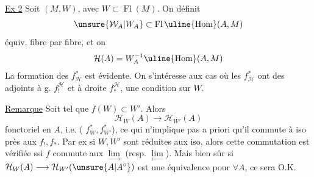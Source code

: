 \uline{Ex 2} Soit $(M,W)$, avec $W\subset\operatorname{Fl}(M)$.
On définit
\[
\unsure{\mathcal W_A|W_A}\subset\operatorname{Fl}\uline{\operatorname{Hom}}(A,M)
\]
 équiv. fibre par fibre, et on
\[
\mathcal H(A)=W_A^{-1}\uline{\operatorname{Hom}}(A,M)
\]
La formation des $f_{\mathcal H}^{*}$ est évidente.
On s'intéresse aux cas où les $f_{\mathcal H}^{*}$
ont des adjoints à g. $f_!^{\mathcal H}$ et à
droite $f_*^{\mathcal H}$, une condition sur $W$.

\uline{Remarque} Soit
tel que $f(W)\subset W'$. Alors
\[
\mathcal H_W(A)\longrightarrow\mathcal H_{W'}(A)
\]
fonctoriel en $A$,
i.e. ( $f_W^{*},f_{W'}^{*}$), ce qui
n'implique pas a priori qu'il commute
à iso près aux $f_!,f_*$.
Par ex si $W,W'$ sont réduites aux iso, alors
cette commutation  est vérifiée
ssi $f$ commute aux $\underset{\longrightarrow}{\lim}$
(resp. $\underset{\longleftarrow}{\lim}$).
Mais bien sûr
si $\mathcal H_W(A)\longrightarrow\mathcal H_{W'}(\unsure{A|A^{\circ}})$ est une équivalence
pour $\forall A$, ce sera O.K.

